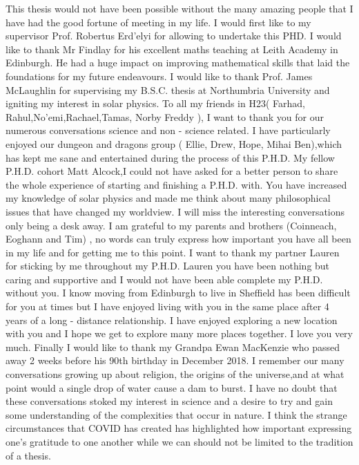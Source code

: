 \begin{acknowledgementslong}
This thesis would not have been possible without the many amazing people that I have had the good fortune of meeting in my life. I would first like to my supervisor Prof. Robertus Erd’elyi for allowing to undertake this PHD. I would like to thank Mr Findlay for his excellent maths teaching at Leith Academy in Edinburgh. He had a huge impact on improving mathematical skills that laid the foundations for my future endeavours.  I would like to thank Prof. James McLaughlin for supervising my B.S.C. thesis at Northumbria University and igniting my interest in solar physics. \np
%
To all my friends in H23( Farhad, Rahul,No’emi,Rachael,Tamas, Norby Freddy ), I want to thank you for our numerous conversations science and non - science related. I have particularly enjoyed our dungeon and dragons group ( Ellie, Drew, Hope, Mihai Ben),which has kept me sane and entertained during the process of this P.H.D. My fellow P.H.D. cohort Matt Alcock,I could not have asked for a better person to share the whole experience of starting and finishing a P.H.D. with. You have increased my knowledge of solar physics and made me think about many philosophical issues that have changed my worldview. I will miss the interesting conversations only being a desk away. \np
%
I am grateful to my parents and brothers (Coinneach, Eoghann and Tim) , no words can truly express how important you have all been in my life and for getting me to this point. I want to thank my partner Lauren for sticking by me throughout my P.H.D. Lauren you have been nothing but caring and supportive and I would not have been able complete my P.H.D. without you. I know moving from Edinburgh to  live in Sheffield has been difficult for you at times but I have enjoyed living with you in the same place after 4 years of a long - distance relationship. I have enjoyed exploring a new location with you and I hope we get to explore many more places together. I love you very much.\np
%
Finally I would like to thank my Grandpa Ewan MacKenzie who passed away 2 weeks before his 90th birthday in December 2018. I remember our many conversations growing up about religion, the origins of the universe,and at what point would a single drop of water cause a dam to burst. I have no doubt that these conversations stoked my interest in science and a desire to try and gain some understanding of the complexities that occur in nature. I think the strange circumstances that COVID has created has highlighted how important expressing one’s gratitude to one another while we can should not be limited to the tradition of a thesis.
\end{acknowledgementslong}